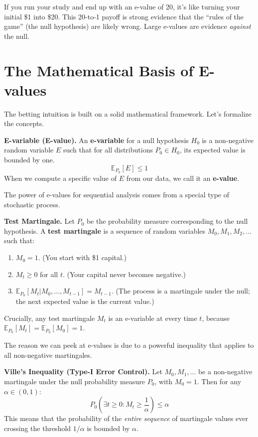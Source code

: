 \documentclass[11pt]{article}
\begin{document}
If you run your study and end up with an e-value of 20, it's like turning your initial \$1 into \$20. This 20-to-1 payoff is strong evidence that the ``rules of the game'' (the null hypothesis) are likely wrong. Large e-values are evidence \textit{against} the null.

\section*{The Mathematical Basis of E-values}

The betting intuition is built on a solid mathematical framework. Let's formalize the concepts.

\begin{defbox}
\textbf{E-variable (E-value).} An \textbf{e-variable} for a null hypothesis $H_0$ is a non-negative random variable $E$ such that for all distributions $P_0 \in H_0$, its expected value is bounded by one.
$$ \mathbb{E}_{P_0}[E] \le 1 $$
When we compute a specific value of $E$ from our data, we call it an \textbf{e-value}.
\end{defbox}

The power of e-values for sequential analysis comes from a special type of stochastic process.

\begin{defbox}
\textbf{Test Martingale.} Let $P_0$ be the probability measure corresponding to the null hypothesis. A \textbf{test martingale} is a sequence of random variables $M_0, M_1, M_2, \dots$ such that:
\begin{enumerate}
    \item $M_0 = 1$. (You start with \$1 capital.)
    \item $M_t \ge 0$ for all $t$. (Your capital never becomes negative.)
    \item $\mathbb{E}_{P_0}[M_t | M_0, \dots, M_{t-1}] = M_{t-1}$. (The process is a martingale under the null; the next expected value is the current value.)
\end{enumerate}
Crucially, any test martingale $M_t$ is an e-variable at every time $t$, because $\mathbb{E}_{P_0}[M_t] = \mathbb{E}_{P_0}[M_0] = 1$.
\end{defbox}

The reason we can peek at e-values is due to a powerful inequality that applies to all non-negative martingales.

\begin{theobox}
\textbf{Ville's Inequality (Type-I Error Control).} Let $M_0, M_1, \dots$ be a non-negative martingale under the null probability measure $P_0$, with $M_0=1$. Then for any $\alpha \in (0,1)$:
$$ P_0 \left( \exists t \ge 0 : M_t \ge \frac{1}{\alpha} \right) \le \alpha $$
This means that the probability of the \textit{entire sequence} of martingale values ever crossing the threshold $1/\alpha$ is bounded by $\alpha$.
\end{theobox}
\end{document}

